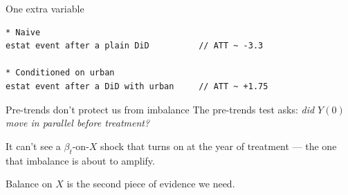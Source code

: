 \documentclass[aspectratio=169,11pt]{beamer}
\begin{document}
\begin{frame}[fragile]{One extra variable}
\vspace{0.6em}
\begin{lstlisting}[language={[ANSI]C},basicstyle=\ttfamily\small]
* Naive
estat event after a plain DiD          // ATT ~ -3.3

* Conditioned on urban
estat event after a DiD with urban     // ATT ~ +1.75
\end{lstlisting}

\vspace{1em}
\begin{center}
\end{center}
\end{frame}

\begin{frame}{Pre-trends don't protect us from imbalance}
\vspace{0.8em}
The pre-trends test asks: \textit{did $Y(0)$ move in parallel before treatment?}

\vspace{0.8em}
It can't see a $\beta_t$-on-$X$ shock that turns on at the year of treatment --- the one that imbalance is about to amplify.

\vspace{1em}
\begin{center}
\end{center}

\vspace{0.6em}
\begin{center}
Balance on $X$ is the second piece of evidence we need.
\end{center}
\end{frame}
\end{document}
